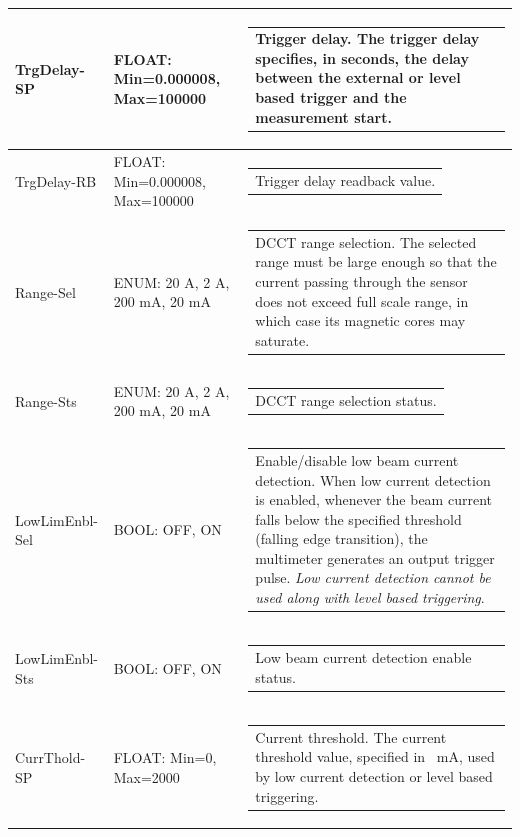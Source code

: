 \documentclass[openany]{article}
\begin{document}
\begin{longtable}{| m{3.0cm} m{4.5cm} m{7.0cm} |}
		TrgDelay-SP & FLOAT: Min=0.000008, Max=100000 & \begin{tabular}{@{}m{6cm}@{}}
	    					Trigger delay. The trigger delay specifies, in seconds, the delay between the external or level based trigger and the measurement start.
						\end{tabular} \\ \hline
		TrgDelay-RB & FLOAT: Min=0.000008, Max=100000 & \begin{tabular}{@{}m{6cm}@{}}
	    					Trigger delay readback value.
						\end{tabular} \\ \hline
		Range-Sel & ENUM: 20 A, 2 A, 200 mA, 20 mA & \begin{tabular}{@{}m{6cm}@{}}
	    					DCCT range selection. The selected range must be large enough so that the current passing through the sensor does not exceed full scale range, in which case its magnetic cores may saturate.
						\end{tabular} \\ \hline
		Range-Sts & ENUM: 20 A, 2 A, 200 mA, 20 mA & \begin{tabular}{@{}m{6cm}@{}}
	    					DCCT range selection status.
						\end{tabular} \\ \hline
		LowLimEnbl-Sel & BOOL: OFF, ON & \begin{tabular}{@{}m{6cm}@{}}
	    					Enable/disable low beam current detection. When low current detection is enabled, whenever the beam current falls below the specified threshold (falling edge transition), the multimeter generates an output trigger pulse. \emph{Low current detection cannot be used along with level based triggering}.
						\end{tabular} \\ \hline
		LowLimEnbl-Sts & BOOL: OFF, ON & \begin{tabular}{@{}m{6cm}@{}}
	    					Low beam current detection enable status.
						\end{tabular} \\ \hline
		CurrThold-SP & FLOAT: Min=0, Max=2000 & \begin{tabular}{@{}m{6cm}@{}}
	    					Current threshold. The current threshold value, specified in \SI{}{\milli\ampere}, used by low current detection or level based triggering.
						\end{tabular} \\ \hline

\end{longtable}
\end{document}

